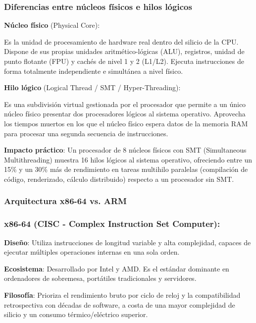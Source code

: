 \documentclass[11.5pt]{article}
\begin{document}
	\begin{tcolorbox}[colback=blue!5!white, colframe=blue!75!black, title=\textbf{TIP}]
	
	\subsubsection*{Diferencias entre núcleos físicos e hilos lógicos}
	\textbf{Núcleo físico} (Physical Core):
	
	Es la unidad de procesamiento de hardware real dentro del silicio de la CPU. Dispone de sus propias unidades aritmético-lógicas (ALU), registros, unidad de punto flotante (FPU) y cachés de nivel 1 y 2 (L1/L2). Ejecuta instrucciones de forma totalmente independiente e simultánea a nivel físico.
	
	\textbf{Hilo lógico} (Logical Thread / SMT / Hyper-Threading):
	
	Es una subdivisión virtual gestionada por el procesador que permite a un único núcleo físico presentar dos procesadores lógicos al sistema operativo. Aprovecha los tiempos muertos en los que el núcleo físico espera datos de la memoria RAM para procesar una segunda secuencia de instrucciones.
	
	\textbf{Impacto práctico}: Un procesador de 8 núcleos físicos con SMT (Simultaneous Multithreading) muestra 16 hilos lógicos al sistema operativo, ofreciendo entre un 15\% y un 30\% más de rendimiento en tareas multihilo paralelas (compilación de código, renderizado, cálculo distribuido) respecto a un procesador sin SMT.
	
	\subsubsection*{Arquitectura x86-64 vs. ARM}
	\subsubsection*{x86-64 (CISC - Complex Instruction Set Computer):}
	
	\textbf{Diseño}: Utiliza instrucciones de longitud variable y alta complejidad, capaces de ejecutar múltiples operaciones internas en una sola orden.
	
	\textbf{Ecosistema}: Desarrollado por Intel y AMD. Es el estándar dominante en ordenadores de sobremesa, portátiles tradicionales y servidores.
	
	\textbf{Filosofía}: Prioriza el rendimiento bruto por ciclo de reloj y la compatibilidad retrospectiva con décadas de software, a costa de una mayor complejidad de silicio y un consumo térmico/eléctrico superior.
	

\end{tcolorbox}
\end{document}
